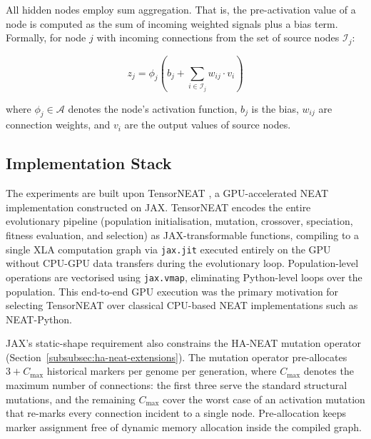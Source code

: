 \documentclass[12pt]{article}
\begin{document}

All hidden nodes employ sum aggregation.
That is, the pre-activation value of a node is computed as the sum of incoming weighted signals plus a bias term.
Formally, for node $j$ with incoming connections from the set of source nodes $\mathcal{I}_j$:

\[z_j = \phi_j\left(b_j + \sum_{i \in \mathcal{I}_j} w_{ij} \cdot v_i\right)\]

where $\phi_j \in \mathcal{A}$ denotes the node's activation function, $b_j$ is the bias, $w_{ij}$ are connection weights, and $v_i$ are the output values of source nodes.

\subsection{Implementation Stack}
\label{subsec:implementation-stack}

The experiments are built upon TensorNEAT \parencite{wang_tensorized_2024}, a GPU-accelerated NEAT implementation constructed on JAX.
TensorNEAT encodes the entire evolutionary pipeline (population initialisation, mutation, crossover, speciation, fitness evaluation, and selection) as JAX-transformable functions, compiling to a single XLA computation graph via \texttt{jax.jit} executed entirely on the GPU without CPU-GPU data transfers during the evolutionary loop.
Population-level operations are vectorised using \texttt{jax.vmap}, eliminating Python-level loops over the population.
This end-to-end GPU execution was the primary motivation for selecting TensorNEAT over classical CPU-based NEAT implementations such as NEAT-Python.

JAX's static-shape requirement also constrains the HA-NEAT mutation operator (Section~\ref{subsubsec:ha-neat-extensions}).
The mutation operator pre-allocates $3 + C_{\max}$ historical markers per genome per generation, where $C_{\max}$ denotes the maximum number of connections: the first three serve the standard structural mutations, and the remaining $C_{\max}$ cover the worst case of an activation mutation that re-marks every connection incident to a single node.
Pre-allocation keeps marker assignment free of dynamic memory allocation inside the compiled graph.
\end{document}
